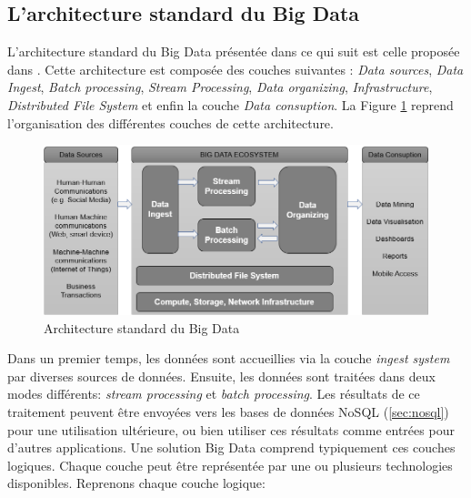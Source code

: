 		\subsection{L'architecture standard du Big Data}
		
		L'architecture standard du Big Data présentée dans ce qui suit est celle proposée dans  \cite{anil-big-data}. Cette architecture  est composée des couches suivantes :  \textit{Data sources}, \textit{Data Ingest}, \textit{Batch processing}, \textit{Stream Processing}, \textit{Data organizing}, \textit{Infrastructure}, \textit{Distributed File System} et enfin la couche \textit{Data consuption}. 
		 La Figure \ref{fig:bigdata-architecture} reprend l'organisation des différentes couches de cette architecture.
		 		\begin{figure}[h]
		 	\captionsetup{justification = centering}
		 	\centering
		 	\includegraphics[width=1\linewidth]{illustrations/bigdata-architecture}
		 	\caption{Architecture standard du Big Data \cite{anil-big-data}}
		 	\label{fig:bigdata-architecture}
		 	
		 \end{figure}
		
		Dans un premier temps, les données sont   accueillies   via la couche  \textit{ingest system} par diverses sources de données. Ensuite, les données sont traitées dans deux modes différents:  \textit{stream processing } et  \textit{batch processing}.  Les résultats de ce traitement peuvent être envoyées vers les bases de données NoSQL (\ref{sec:nosql}) pour une utilisation ultérieure, ou bien  utiliser ces résultats comme entrées pour d'autres applications.  Une solution Big Data comprend typiquement  ces  couches logiques. Chaque  couche peut être représentée par une ou plusieurs technologies disponibles. Reprenons chaque couche logique:
		
